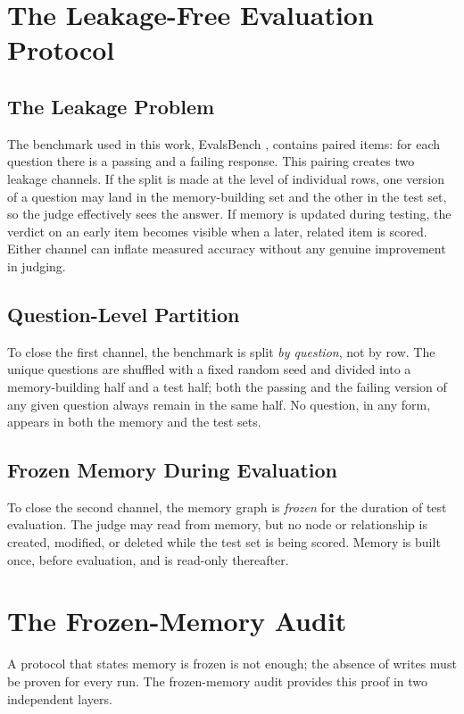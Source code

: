 \documentclass[14pt,a4paper]{extreport}
\begin{document}
\section{The Leakage-Free Evaluation Protocol}

\subsection{The Leakage Problem}

The benchmark used in this work, EvalsBench \cite{evalsbench2024}, contains paired items: for each question there is a passing and a failing response. This pairing creates two leakage channels. If the split is made at the level of individual rows, one version of a question may land in the memory-building set and the other in the test set, so the judge effectively sees the answer. If memory is updated during testing, the verdict on an early item becomes visible when a later, related item is scored. Either channel can inflate measured accuracy without any genuine improvement in judging.

\subsection{Question-Level Partition}

To close the first channel, the benchmark is split \emph{by question}, not by row. The unique questions are shuffled with a fixed random seed and divided into a memory-building half and a test half; both the passing and the failing version of any given question always remain in the same half. No question, in any form, appears in both the memory and the test sets.

\subsection{Frozen Memory During Evaluation}

To close the second channel, the memory graph is \emph{frozen} for the duration of test evaluation. The judge may read from memory, but no node or relationship is created, modified, or deleted while the test set is being scored. Memory is built once, before evaluation, and is read-only thereafter.

\section{The Frozen-Memory Audit}

A protocol that states memory is frozen is not enough; the absence of writes must be proven for every run. The frozen-memory audit provides this proof in two independent layers.
\end{document}
